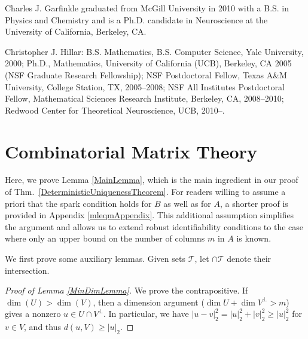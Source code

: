 \documentclass[journal, twocolumn]{IEEEtran}
\begin{document}




\begin{IEEEbiographynophoto}{Charles J. Garfinkle}
graduated from McGill University in 2010 with a B.S. in Physics and Chemistry and is a Ph.D. candidate in Neuroscience at the University of California, Berkeley, CA.
\end{IEEEbiographynophoto}


\begin{IEEEbiographynophoto}{Christopher J. Hillar:} B.S. Mathematics, B.S. Computer Science, Yale University, 2000; Ph.D., Mathematics, University of California (UCB), Berkeley, CA 2005 (NSF Graduate Research Fellowship); NSF Postdoctoral Fellow, Texas A\&M University, College Station, TX, 2005--2008; NSF All Institutes Postdoctoral Fellow, Mathematical Sciences Research Institute, Berkeley, CA, 2008--2010; Redwood Center for Theoretical Neuroscience, UCB, 2010--.  %
\end{IEEEbiographynophoto}


\appendices
\section{Combinatorial Matrix Theory}\label{appendixA}

Here, we prove Lemma \ref{MainLemma}, which is the main ingredient in our proof of Thm.~\ref{DeterministicUniquenessTheorem}. For readers willing to assume a priori that the spark condition holds for $B$ as well as for $A$, a shorter proof is provided in Appendix \ref{mleqmAppendix}. This additional assumption simplifies the argument and allows us to extend robust identifiability conditions to the case where only an upper bound on the number of columns $m$ in $A$ is known. 

We first prove some auxiliary lemmas. %
Given sets $\mathcal{T}$, let $\cap \mathcal{T}$ denote their intersection.

\begin{proof}[Proof of Lemma \ref{MinDimLemma}]
We prove the contrapositive.  If $\dim(U) > \dim(V)$, then a dimension argument ($\dim U + \dim V^\perp > m$) gives a nonzero $u \in U \cap V^\perp$.  In particular, we have $|u - v|_2^2 = |u|_2^2 + |v|_2^2 \geq |u|_2^2$ for $v \in V$, and thus $d(u,V) \geq |u|_2$.
\end{proof}
\end{document}
